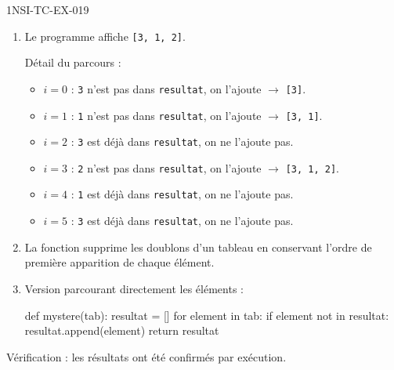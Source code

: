 \begin{corrige}{1NSI-TC-EX-019}
\begin{enumerate}
  \item Le programme affiche \lstinline{[3, 1, 2]}.

  Détail du parcours :
  \begin{itemize}
    \item $i=0$ : \lstinline{3} n'est pas dans \lstinline{resultat}, on l'ajoute $\to$ \lstinline{[3]}.
    \item $i=1$ : \lstinline{1} n'est pas dans \lstinline{resultat}, on l'ajoute $\to$ \lstinline{[3, 1]}.
    \item $i=2$ : \lstinline{3} est déjà dans \lstinline{resultat}, on ne l'ajoute pas.
    \item $i=3$ : \lstinline{2} n'est pas dans \lstinline{resultat}, on l'ajoute $\to$ \lstinline{[3, 1, 2]}.
    \item $i=4$ : \lstinline{1} est déjà dans \lstinline{resultat}, on ne l'ajoute pas.
    \item $i=5$ : \lstinline{3} est déjà dans \lstinline{resultat}, on ne l'ajoute pas.
  \end{itemize}

  \item La fonction supprime les doublons d'un tableau en conservant l'ordre de première apparition de chaque élément.

  \item Version parcourant directement les éléments :
\begin{python}
def mystere(tab):
    resultat = []
    for element in tab:
        if element not in resultat:
            resultat.append(element)
    return resultat
\end{python}
\end{enumerate}

Vérification : les résultats ont été confirmés par exécution.
\end{corrige}
